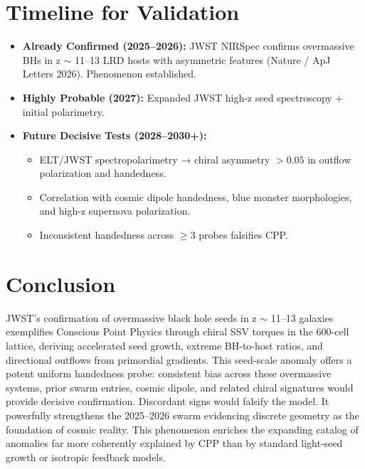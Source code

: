 \documentclass[11pt]{article}
\begin{document}
\section{Timeline for Validation}
\begin{itemize}
    \item \textbf{Already Confirmed (2025--2026):} JWST NIRSpec confirms overmassive BHs in z $\sim$ 11--13 LRD hosts with asymmetric features (Nature / ApJ Letters 2026). Phenomenon established.
    \item \textbf{Highly Probable (2027):} Expanded JWST high-z seed spectroscopy + initial polarimetry.
    \item \textbf{Future Decisive Tests (2028--2030+):}
    \begin{itemize}
        \item ELT/JWST spectropolarimetry → chiral asymmetry $>0.05$ in outflow polarization and handedness.
        \item Correlation with cosmic dipole handedness, blue monster morphologies, and high-z supernova polarization.
        \item Inconsistent handedness across $\geq 3$ probes falsifies CPP.
    \end{itemize}
\end{itemize}

\section{Conclusion}
JWST's confirmation of overmassive black hole seeds in z $\sim$ 11--13 galaxies exemplifies Conscious Point Physics through chiral SSV torques in the 600-cell lattice, deriving accelerated seed growth, extreme BH-to-host ratios, and directional outflows from primordial gradients.  
This seed-scale anomaly offers a potent uniform handedness probe: consistent bias across these overmassive systems, prior swarm entries, cosmic dipole, and related chiral signatures would provide decisive confirmation. Discordant signs would falsify the model. It powerfully strengthens the 2025--2026 swarm evidencing discrete geometry as the foundation of cosmic reality.  
This phenomenon enriches the expanding catalog of anomalies far more coherently explained by CPP than by standard light-seed growth or isotropic feedback models.
\end{document}
